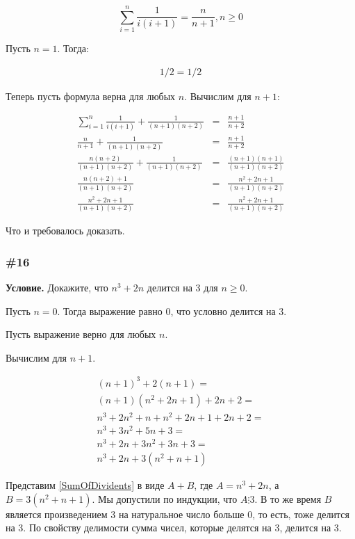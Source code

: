 \documentclass{article}
\begin{document}
\begin{equation}
    \sum_{i=1}^n \frac{1}{i(i+1)} = \frac{n}{n + 1}, n \geqslant 0
\end{equation}

Пусть \(n=1\). Тогда:

\begin{eqnarray}
    1/2 = 1/2
\end{eqnarray}

Теперь пусть формула верна для любых \(n\).
Вычислим для \(n+1\):

\begin{eqnarray}
    \sum_{i=1}^n \frac{1}{i(i+1)} + \frac{1}{(n+1)(n+2)} &=& \frac{n + 1}{n + 2}\\
    \frac{n}{n+1} + \frac{1}{(n+1)(n+2)} &=& \frac{n+1}{n+2}\\
    \frac{n(n+2)}{(n+1)(n+2)} + \frac{1}{(n+1)(n+2)} &=& \frac{(n+1)(n+1)}{(n+1)(n+2)}\\
    \frac{n(n+2) + 1}{(n+1)(n+2)} &=& \frac{n^2 + 2n + 1}{(n+1)(n+2)}\\
    \frac{n^2 + 2n + 1}{(n+1)(n+2)} &=& \frac{n^2 + 2n + 1}{(n+1)(n+2)}
\end{eqnarray}

Что и требовалось доказать.

\subsubsection{\#16}

\textbf{Условие.}
Докажите, что \(n^3 + 2n\) делится на \(3\) для \(n \geqslant 0\).

Пусть \(n = 0\).
Тогда выражение равно 0, что условно делится на 3.

Пусть выражение верно для любых \(n\).

Вычислим для \(n+1\).

\begin{align}
    (n+1)^3 + 2(n+1) =\\
    (n+1)(n^2 + 2n + 1) + 2n + 2 =\\
    n^3 + 2n^2 + n + n^2 + 2n + 1 + 2n + 2 =\\
    n^3 + 3n^2 + 5n + 3 =\\
    n^3 + 2n + 3n^2 + 3n + 3 =\\
    n^3 + 2n + 3(n^2 + n + 1) \label{SumOfDividents}
\end{align}

Представим \eqref{SumOfDividents} в виде \(A + B\), где \(A = n^3 + 2n\),
а \(B = 3(n^2 + n + 1)\).
Мы допустили по индукции, что \(A \vdots 3\).
В то же время \(B\) является произведением 3 на натуральное число больше 0,
то есть, тоже делится на 3.
По свойству делимости сумма чисел, которые делятся на 3, делится на 3.
\end{document}
